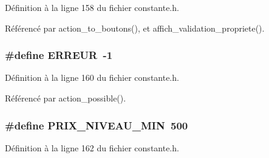 D\'{e}finition \`{a} la ligne 158 du fichier constante.h.

R\'{e}f\'{e}renc\'{e} par action\_\-to\_\-boutons(), et affich\_\-validation\_\-propriete().
\subsubsection{\setlength{\rightskip}{0pt plus 5cm}\#define ERREUR~-1}\label{constante_8h_8a9dac7f648d09d16b17ff585c9f2efe}




D\'{e}finition \`{a} la ligne 160 du fichier constante.h.

R\'{e}f\'{e}renc\'{e} par action\_\-possible().
\subsubsection{\setlength{\rightskip}{0pt plus 5cm}\#define PRIX\_\-NIVEAU\_\-MIN~500}\label{constante_8h_551aa387cb0ed6375a86b626c1c400c6}




D\'{e}finition \`{a} la ligne 162 du fichier constante.h.